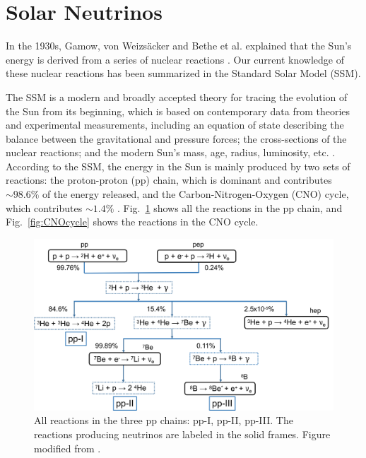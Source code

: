 \section{Solar Neutrinos}\label{sect:solarNu}

In the 1930s, Gamow, von Weizs{\"a}cker and Bethe et al. explained that the Sun's energy is derived from a series of nuclear reactions \cite{bethe1939energy}. Our current knowledge of these nuclear reactions has been summarized in the Standard Solar Model (SSM). 

The SSM is a modern and broadly accepted theory for tracing the evolution of the Sun from its beginning, which is based on contemporary data from theories and experimental measurements, including an equation of state describing the balance between the gravitational and pressure forces; the cross-sections of the nuclear reactions; and the modern Sun's mass, age, radius, luminosity, etc. \cite{haxton2013solar}. According to the SSM, the energy in the Sun is mainly produced by two sets of reactions: the proton-proton (pp) chain, which is dominant and contributes $\sim 98.6\%$ of the energy released, and the Carbon-Nitrogen-Oxygen (CNO) cycle, which contributes $\sim 1.4\%$ \cite{antonio2018state}. Fig.~\ref{fig:ppChain} shows all the reactions in the pp chain, and Fig.~\ref{fig:CNOcycle} shows the reactions in the CNO cycle. 

\begin{figure}[htbp]
	\centering	
	\includegraphics[width=14cm]{ppChain.png}
	\caption[All reactions in the three pp chains.]{All reactions in the three pp chains: pp-I, pp-II, pp-III. The reactions producing neutrinos are labeled in the solid frames. Figure modified from \cite{oberauer2020solar}.	\label{fig:ppChain}}
\end{figure}

